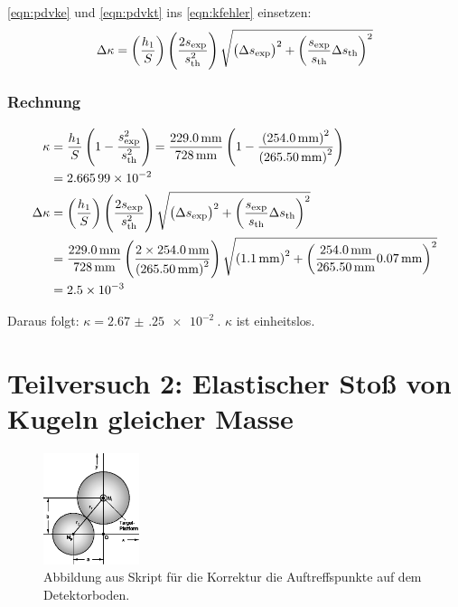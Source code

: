\documentclass[twoside]{article}
\begin{document}
            \eqref{eqn:pdvke} und \eqref{eqn:pdvkt} ins \eqref{eqn:kfehler} einsetzen:
            \begin{equation}
                \Delta \kappa = \left(\frac{h_1}{S}\right)\left(\frac{2s_{\text{exp}}}{s_{\text{th}}^2}\right)\sqrt{\left(\Delta s_{\text{exp}}\right)^2 + \left(\frac{s_{\text{exp}}}{s_{\text{th}}}\Delta s_{\text{th}} \right)^2}
            \end{equation}
        \subsubsection{Rechnung}
            \begin{align}
                \kappa &= \frac{h_1}{S}\left(1 - \frac{s_{\text{exp}}^2}{s_{\text{th}}^2}\right) = \frac{\SI{229.0}{\milli\meter}}{\SI{728}{\milli\meter}}\left(1 - \frac{\left(\SI{254.0}{\milli\meter}\right)^2}{\left(\SI{265.50}{\milli\meter}\right)^2}\right)\notag \\
                & = \SI{2.66599e-2}{} \\
                \Delta \kappa &= \left(\frac{h_1}{S}\right)\left(\frac{2s_{\text{exp}}}{s_{\text{th}}^2}\right)\sqrt{\left(\Delta s_{\text{exp}}\right)^2 + \left(\frac{s_{\text{exp}}}{s_{\text{th}}}\Delta s_{\text{th}} \right)^2} \notag \\
                &= \frac{\SI{229.0}{\milli\meter}}{\SI{728}{\milli\meter}}\left(\frac{2\times\SI{254.0}{\milli\meter}}{\left(\SI{265.50}{\milli\meter}\right)^2}\right) \sqrt{\left(\SI{1.1}{\milli\meter}\right)^2 + \left(\frac{\SI{254.0}{\milli\meter}}{\SI{265.50}{\milli\meter}}\SI{0.07}{\milli\meter} \right)^2} \notag \\
                &= \SI{2.5e-3}{}
            \end{align}

            Daraus folgt: $\kappa = \SI{2.67(25)e-2}{}$. $\kappa$ ist einheitslos.

\section{Teilversuch 2: Elastischer Stoß von Kugeln gleicher Masse}
    \begin{figure}
        \begin{center}
            \includegraphics[width=0.25\textwidth]{kugelkorrektur.eps}
        \end{center}
        \caption{Abbildung aus Skript für die Korrektur die Auftreffspunkte auf dem Detektorboden. \vspace{-3\baselineskip}}
    \end{figure}
\end{document}
